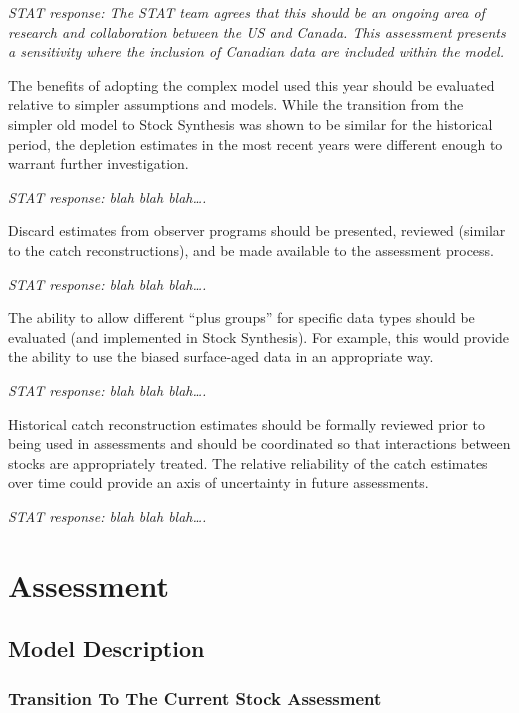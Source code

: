 \documentclass[12pt,]{article}
\begin{document}
\emph{STAT response: The STAT team agrees that this should be an ongoing
area of research and collaboration between the US and Canada. This
assessment presents a sensitivity where the inclusion of Canadian data
are included within the model.}

The benefits of adopting the complex model used this year should be
evaluated relative to simpler assumptions and models. While the
transition from the simpler old model to Stock Synthesis was shown to be
similar for the historical period, the depletion estimates in the most
recent years were different enough to warrant further investigation.

\emph{STAT response: blah blah blah\ldots{}.}

Discard estimates from observer programs should be presented, reviewed
(similar to the catch reconstructions), and be made available to the
assessment process.

\emph{STAT response: blah blah blah\ldots{}.}

The ability to allow different ``plus groups'' for specific data types
should be evaluated (and implemented in Stock Synthesis). For example,
this would provide the ability to use the biased surface-aged data in an
appropriate way.

\emph{STAT response: blah blah blah\ldots{}.}

Historical catch reconstruction estimates should be formally reviewed
prior to being used in assessments and should be coordinated so that
interactions between stocks are appropriately treated. The relative
reliability of the catch estimates over time could provide an axis of
uncertainty in future assessments.

\emph{STAT response: blah blah blah\ldots{}.}

\section{Assessment}\label{assessment}

\subsection{Model Description}\label{model-description}

\subsubsection{Transition To The Current Stock
Assessment}\label{transition-to-the-current-stock-assessment}
\end{document}

